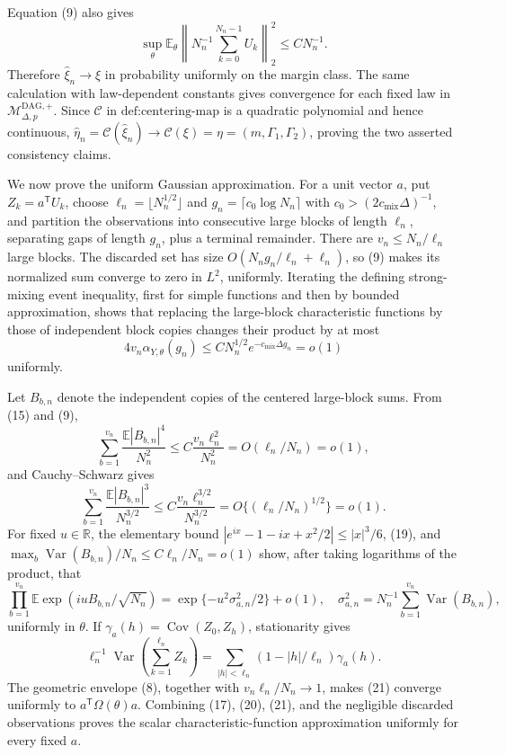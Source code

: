 Equation (9) also gives
\[
 \sup_\theta\mathbb E_\theta
 \left\lVert N_n^{-1}\sum_{k=0}^{N_n-1}U_k\right\rVert_2^2
 \leq C N_n^{-1}.
\tag{16}
\]
Therefore \(\widehat\xi_n\to\xi\) in probability uniformly on the margin class.  The same calculation with law-dependent constants gives convergence for each fixed law in \(\mathcal M_{\Delta,p}^{\mathrm{DAG},+}\).  Since \(\mathcal C\) in \(\text{def:centering-map}\) is a quadratic polynomial and hence continuous, \(\widehat\eta_n=\mathcal C(\widehat\xi_n)\to\mathcal C(\xi)=\eta=(m,\Gamma_1,\Gamma_2)\), proving the two asserted consistency claims.

We now prove the uniform Gaussian approximation.  For a unit vector \(a\), put \(Z_k=a^{\mathsf T}U_k\), choose \(\ell_n=\lfloor N_n^{1/2}\rfloor\) and \(g_n=\lceil c_0\log N_n\rceil\) with \(c_0>(2c_{\mathrm{mix}}\Delta)^{-1}\), and partition the observations into consecutive large blocks of length \(\ell_n\), separating gaps of length \(g_n\), plus a terminal remainder.  There are \(v_n\leq N_n/\ell_n\) large blocks.  The discarded set has size \(O(N_ng_n/\ell_n+\ell_n)\), so (9) makes its normalized sum converge to zero in \(L^2\), uniformly.  Iterating the defining strong-mixing event inequality, first for simple functions and then by bounded approximation, shows that replacing the large-block characteristic functions by those of independent block copies changes their product by at most
\[
 4v_n\alpha_{Y,\theta}(g_n)
 \leq C N_n^{1/2}e^{-c_{\mathrm{mix}}\Delta g_n}=o(1)
\tag{17}
\]
uniformly.

Let \(B_{b,n}\) denote the independent copies of the centered large-block sums.  From (15) and (9),
\[
 \sum_{b=1}^{v_n}\frac{\mathbb E|B_{b,n}|^4}{N_n^2}
 \leq C\frac{v_n\ell_n^2}{N_n^2}
 =O(\ell_n/N_n)=o(1),
\tag{18}
\]
and Cauchy--Schwarz gives
\[
 \sum_{b=1}^{v_n}\frac{\mathbb E|B_{b,n}|^3}{N_n^{3/2}}
 \leq C\frac{v_n\ell_n^{3/2}}{N_n^{3/2}}
 =O\{(\ell_n/N_n)^{1/2}\}=o(1).
\tag{19}
\]
For fixed \(u\in\mathbb R\), the elementary bound \(|e^{ix}-1-ix+x^2/2|\leq |x|^3/6\), (19), and \(\max_b\operatorname{Var}(B_{b,n})/N_n\leq C\ell_n/N_n=o(1)\) show, after taking logarithms of the product, that
\[
 \prod_{b=1}^{v_n}\mathbb E\exp(iuB_{b,n}/\sqrt{N_n})
 =\exp\{-u^2\sigma_{a,n}^2/2\}+o(1),
 \quad
 \sigma_{a,n}^2=N_n^{-1}\sum_{b=1}^{v_n}\operatorname{Var}(B_{b,n}),
\tag{20}
\]
uniformly in \(\theta\).  If \(\gamma_a(h)=\operatorname{Cov}(Z_0,Z_h)\), stationarity gives
\[
 \ell_n^{-1}\operatorname{Var}\left(\sum_{k=1}^{\ell_n}Z_k\right)
 =\sum_{|h|<\ell_n}(1-|h|/\ell_n)\gamma_a(h).
\tag{21}
\]
The geometric envelope (8), together with \(v_n\ell_n/N_n\to1\), makes (21) converge uniformly to \(a^{\mathsf T}\Omega(\theta)a\).  Combining (17), (20), (21), and the negligible discarded observations proves the scalar characteristic-function approximation uniformly for every fixed \(a\).


